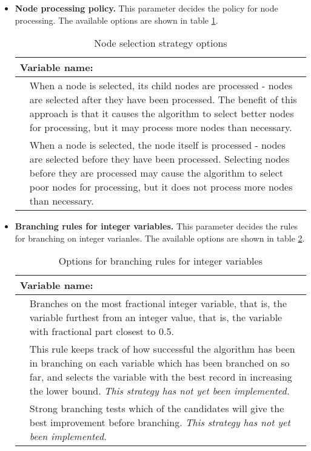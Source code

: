 \begin{itemize}
\item{\textbf{Node processing policy.}} This parameter decides the policy for node processing. The available options are shown in table \ref{tbl:nodeprocessing}.
\begin{table}[H]
	\begin{tabular}[c]{|l|p{10.5cm}|}
		\hline
		\multicolumn{2}{|l|}{Variable name: \member{nodeProcessingPolicy}} \\
		\hline
		\class{EAGER} & When a node is selected, its child nodes are processed - nodes are selected after they have been processed. The benefit of this approach is that it causes the algorithm to select better nodes for processing, but it may process more nodes than necessary.\\
		\hline
		\class{LAZY} & When a node is selected, the node itself is processed - nodes are selected before they have been processed. Selecting nodes before they are processed may cause the algorithm to select poor nodes for processing, but it does not process more nodes than necessary.\\
		\hline
	\end{tabular}
\caption{Node selection strategy options}
\label{tbl:nodeprocessing}
\end{table}

\item{\textbf{Branching rules for integer variables.}} This parameter decides the rules for branching on integer varianles. The available options are shown in table \ref{tbl:branchinginteger}.
\begin{table}[H]
	\begin{tabular}[c]{|l|p{8.6cm}|}
		\hline
		\multicolumn{2}{|l|}{Variable name: \member{branchingRuleInteger}} \\
		\hline
		\class{MOST\_FRACTIONAL} & Branches on the most fractional integer variable, that is, the variable furthest from an integer value, that is, the variable with fractional part closest to 0.5. \\
		\hline
		\class{PSEUDOCOST} & This rule keeps track of how successful the algorithm has been in branching on each variable which has been branched on so far, and selects the variable with the best record in increasing the lower bound. \emph{This strategy has not yet been implemented.}\\
		\hline
		\class{STRONG\_BRANCHING} & Strong branching tests which of the candidates will give the best improvement before branching. \emph{This strategy has not yet been implemented.} \\
		\hline
	\end{tabular}
\caption{Options for branching rules for integer variables}
\label{tbl:branchinginteger}
\end{table}


\end{itemize}
